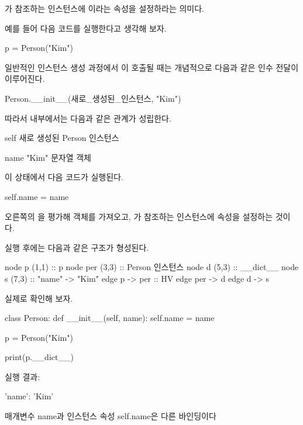 가 참조하는 인스턴스에 이라는 속성을 설정하라는 의미다.

예를 들어 다음 코드를 실행한다고 생각해 보자.

\begin{dhkcode}
p = Person("Kim")
\end{dhkcode}

일반적인 인스턴스 생성 과정에서 이 호출될 때는 개념적으로 다음과 같은 인수 전달이 이루어진다.

\begin{dhkcode}
Person.__init__(새로_생성된_인스턴스, "Kim")
\end{dhkcode}

따라서  내부에서는 다음과 같은 관계가 성립한다.

\begin{dhksmry}
    self \ra 새로 생성된 Person 인스턴스

    name \ra "Kim" 문자열 객체
\end{dhksmry}

이 상태에서 다음 코드가 실행된다.

\begin{dhkcode}
self.name = name
\end{dhkcode}

오른쪽의 을 평가해  객체를 가져오고, 가 참조하는 인스턴스에  속성을 설정하는 것이다.

실행 후에는 다음과 같은 구조가 형성된다.

\begin{dhkdiagram}[in=6]
node p (1,1) :: p
node per (3,3) :: Person 인스턴스
node d (5,3) :: __dict__
node s (7,3) :: "name" -> "Kim"
edge p -> per :: HV
edge per -> d
edge d -> s
\end{dhkdiagram}

실제로 확인해 보자.

\begin{dhkcode}
class Person:
    def __init__(self, name):
        self.name = name

p = Person("Kim")

print(p.__dict__)
\end{dhkcode}

실행 결과:

\begin{dhkzsh}
{'name': 'Kim'}
\end{dhkzsh}

\begin{dhknote}
\begin{dhksmry}[centered]
매개변수 name과 인스턴스 속성 self.name은 다른 바인딩이다
\end{dhksmry}
\end{dhknote}

